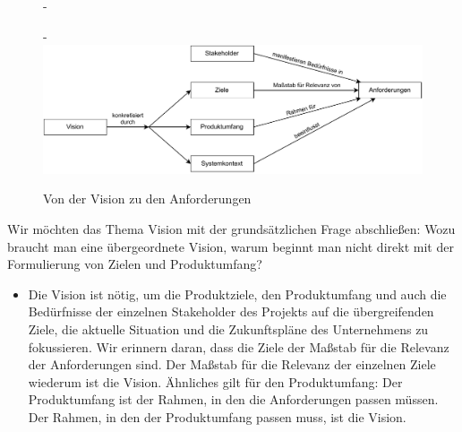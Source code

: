 \begin{figure}[h!]
	\begin{addmargin*}[0cm]{-\marginparwidth}
	\begin{addmargin*}[0cm]{-\marginparsep}
		\includegraphics[scale=0.95]{Bilder/Kapitel-6/begriffe-version2.pdf}
		\caption{Von der Vision zu den Anforderungen}
		\label{fig:von_vision_zu_anforderungen}
	\end{addmargin*}
	\end{addmargin*}
\end{figure}

\pagebreak %

Wir  möchten das Thema Vision mit der grundsätzlichen Frage abschließen: Wozu braucht man eine übergeordnete Vision, warum beginnt man nicht direkt mit der Formulierung von Zielen und Produktumfang?

\begin{itemize}[
	label={\sttpHervorhebung{$\Rightarrow$}},
	]
	\item Die Vision ist nötig, um die Produktziele, den Produktumfang und auch die Bedürfnisse der einzelnen Stakeholder des Projekts auf die übergreifenden Ziele, die aktuelle Situation und die Zukunftspläne des Unternehmens zu fokussieren. Wir erinnern daran, dass die Ziele der Maßstab für die Relevanz der Anforderungen sind. Der Maßstab für die Relevanz der einzelnen Ziele wiederum ist die Vision. Ähnliches gilt für den Produktumfang: Der Produktumfang ist der Rahmen, in den die Anforderungen passen müssen. Der Rahmen, in den der Produktumfang passen muss, ist die Vision. 
\end{itemize}